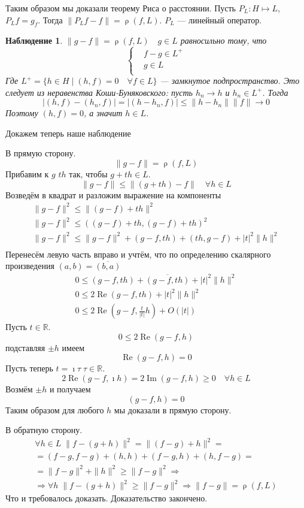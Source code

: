 \documentclass[12pt]{article}
\DeclareMathOperator{\rh}{\rho}
\renewcommand{\Im}{\operatorname{Im}}
\renewcommand{\Re}{\operatorname{Re}}
\begin{document}
Таким образом мы доказали теорему Риса о расстоянии.
Пусть $P_L : H \mapsto L$, $P_L f = g_f$.
Тогда $\|P_Lf - f\| = \rh(f, L)$. $P_L$ --- линейный оператор.
\newtheorem{Nubl}{Наблюдение}
\begin{Nubl}
	$\|g - f\| = \rh(f, L)\quad g \in L$ равносильно тому, что 
	$$
	\left\{
		\begin{aligned}
			&f - g \in L^{+}\\
        	&g \in L\\
    	\end{aligned}
	\right.
	$$
	Где $L^+ = \{h \in H \mid (h, f) = 0 \quad \forall f \in L\}$ --- замкнутое подпространство.
	Это следует из неравенства Коши-Буняковского: пусть $h_n \to h$ и $h_n \in L^+$.
	Тогда
	$$
	|(h, f) - (h_n, f)| = |(h - h_n, f)| \le \|h - h_n\| \|f\|\to 0
	$$
	Поэтому $(h, f)=0$, а значит $h \in L$.
\end{Nubl}
Докажем теперь наше наблюдение
\begin{Proof}
    В прямую сторону.
    $$
    \|g - f\| = \rh(f, L)
    $$
    Прибавим к $g$ $th$ так, чтобы $g + th \in L$.
    $$
    \|g - f\| \le \|(g + t h) - f\| \quad \forall h \in L
    $$
    Возведём в квадрат и разложим выражение на компоненты
    \begin{gather*}
        \|g - f\|^2 \le \|(g - f) + t h\|^2\\
        \|g - f\|^2 \le ((g - f) + t h, (g - f) + t h)^2\\
        \|g - f\|^2 \le \|g - f\|^2 + (g - f, t h) + (t h, g - f) + |t|^2 \|h\|^2\\
	\end{gather*}
	Перенесём левую часть вправо и учтём, что по определению скалярного произведения $(a, b) = \overline{(b, a)}$
	\begin{gather*}
        0 \le (g - f, t h) + \overline{(g - f, t h)} + |t|^2 \|h\|^2\\ 
        0 \le 2\Re(g - f,t h) + |t|^2 \|h\|^2\\
        0 \le 2\Re(g - f, \frac{t}{|t|} h) + O(|t|)
	\end{gather*}
    Пусть $t \in \mathbb R$.
    $$
    0 \le 2\Re(g - f, h)
    $$
    подставляя $\pm h$ имеем
    $$
    \Re(g - f, h) = 0
    $$
    Пусть теперь $t = \imath \tau\; \tau \in \mathbb R$.
    $$
    2\Re(g - f, \imath h) = 2\Im(g - f, h) \ge 0\quad\forall h \in L
    $$
    Возмём $\pm h$ и получаем
    $$
    (g - f, h) = 0
    $$
    Таким образом для любого $h$ мы доказали в прямую сторону.
    
    В обратную сторону.
    \begin{multline*}
    \forall h \in L\;\|f - (g + h)\|^2 = \|(f - g) + h\|^2 =\\
     = (f - g, f - g) + (h, h) + (f - g, h) + (h, f - g) =\\
    = \|f - g\|^2+\|h\|^2 \ge \|f - g\|^2 \Rightarrow \\
    \Rightarrow \forall h\;\|f - (g + h)\|^2 \ge \|f - g\|^2 \Rightarrow \|f - g\| = \rh(f, L)
    \end{multline*}
    Что и требовалось доказать.
    Доказательство закончено.
\end{Proof}
\end{document}
